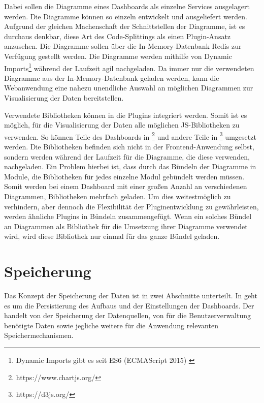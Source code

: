 Dabei sollen die Diagramme eines Dashboards als einzelne Services ausgelagert werden.
Die Diagramme können so einzeln entwickelt und ausgeliefert werden. Aufgrund der
gleichen Machenschaft der Schnittstellen der Diagramme, ist es durchaus denkbar, diese Art des Code-Splittings als
einen Plugin-Ansatz anzusehen. Die Diagramme sollen über die In-Memory-Datenbank
Redis zur Verfügung gestellt werden. Die Diagramme werden mithilfe
von Dynamic Imports\footnote{Dynamic Imports gibt es seit ES6 (ECMAScript 2015) \cite{DynamicImportsV8}}
während der Laufzeit agil nachgeladen. Da immer nur die verwendeten Diagramme aus der In-Memory-Datenbank
geladen werden, kann die Webanwendung eine nahezu unendliche Auswahl an möglichen Diagrammen zur Visualisierung
der Daten bereitstellen.

Verwendete Bibliotheken können in die Plugins integriert werden. Somit ist es möglich, für die Visualisierung
der Daten alle möglichen JS-Bibliotheken zu verwenden. So können Teile des Dashboards
in \footnote{https://www.chartjs.org/} und andere Teile in \footnote{https://d3js.org/}
umgesetzt werden. Die Bibliotheken befinden sich nicht in der Frontend-Anwendung selbst,
sondern werden während der Laufzeit für die Diagramme, die diese verwenden, nachgeladen.
Ein Problem hierbei ist, dass durch das Bündeln der Diagramme in Module, die Bibliotheken für jedes einzelne
Modul gebündelt werden müssen. Somit werden bei einem Dashboard mit einer großen Anzahl an verschiedenen
Diagrammen, Bibliotheken mehrfach geladen. Um dies weitestmöglich zu verhindern, aber dennoch die Flexibilität
der Pluginentwicklung zu gewährleisten, werden ähnliche Plugins in Bündeln zusammengefügt. Wenn ein solches
Bündel an Diagrammen  als Bibliothek für die Umsetzung ihrer Diagramme verwendet wird, wird diese
Bibliothek nur einmal für das ganze Bündel geladen.

\section{Speicherung}
\label{sec:speicherung}
Das Konzept der Speicherung der Daten ist in zwei Abschnitte unterteilt.
In  geht es um die Persistierung des Aufbaus und der
Einstellungen der Dashboards. Der  handelt
von der Speicherung der Datenquellen, von für die Benutzerverwaltung benötigte Daten
sowie jegliche weitere für die Anwendung relevanten Speichermechanismen.

